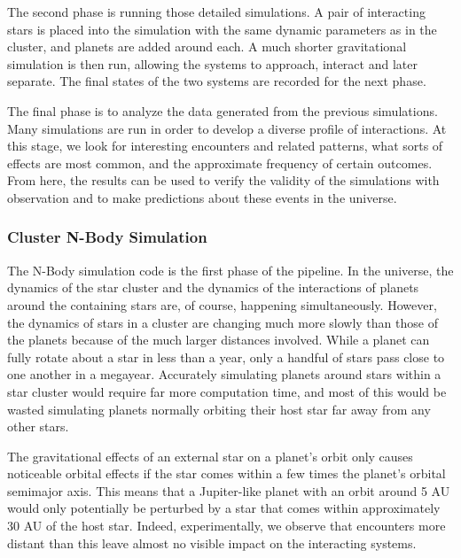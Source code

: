 \documentclass[12pt]{article}
\begin{document}
    The second phase is running those detailed simulations. A pair of interacting stars
    is placed into the simulation with the same dynamic parameters as in the cluster,
    and planets are added around each. A much shorter gravitational simulation is then
    run, allowing the systems to approach, interact and later separate. The final
    states of the two systems are recorded for the next phase.

    The final phase is to analyze the data generated from the previous simulations.
    Many simulations are run in order to develop a diverse profile of interactions.
    At this stage, we look for interesting encounters and related patterns, 
    what sorts of effects are most common,
    and the approximate frequency of certain outcomes. From here, the results can
    be used to verify the validity of the simulations with observation and to make
    predictions about these events in the universe.


    \subsubsection{Cluster N-Body Simulation}

    The N-Body simulation code is the first phase of the pipeline. In the
    universe, the dynamics of the star cluster and the dynamics of the
    interactions of planets around the containing stars are, of course, happening
    simultaneously. However, the dynamics of stars in a cluster are changing much
    more slowly than those of the planets because of the much larger distances
    involved. While a planet can fully rotate about a star in less than a year,
    only a handful of stars pass close to one another in a megayear. Accurately
    simulating planets around stars within a star cluster would require
    far more computation time, and most of this would be wasted simulating
    planets normally orbiting their host star far away from any other stars.

    The gravitational effects of an external star on a planet's orbit only
    causes noticeable orbital effects if the star comes within a few times the
    planet's orbital semimajor axis. This means that a Jupiter-like planet with an orbit around
    5 AU would only potentially be perturbed by a star that comes within 
    approximately 30 AU of the host star. Indeed, experimentally, we observe that
    encounters more distant than this leave almost no visible impact on the
    interacting systems. 
\end{document}
